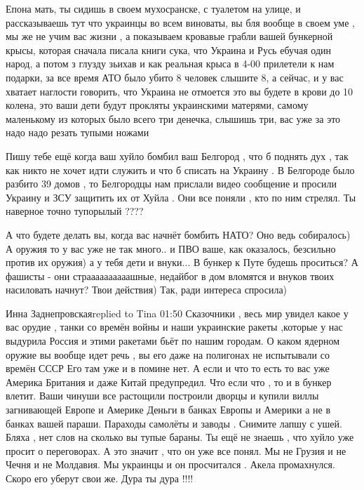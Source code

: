 {Епона мать, ты сидишь в своем мухосранске, с туалетом на улице, и рассказываешь
тут что украинцы во всем виноваты, вы бля вообще в своем уме , мы же не учим
вас жизни , а показываем кровавые грабли вашей бункерной крысы, которая сначала
писала книги сука, что Украина и Русь ебучая один народ, а потом з глузду
зьихав и как реальная крыса в 4-00 прилетели к нам подарки, за все время АТО
было убито 8 человек слышите 8, а сейчас, и у вас хватает наглости говорить,
что Украина не отмоется это вы будете в крови до 10 колена, это ваши дети будут
прокляты украинскими матерями, самому маленькому из которых было всего три
денечка, слышишь три, вас уже за это надо надо резать тупыми ножами


Пишу тебе ещё когда ваш хуйло бомбил ваш Белгород , что б поднять дух , так как
никто не хочет идти служить и что б списать на Украину . В Белгороде было
разбито 39 домов , то Белгородцы нам прислали видео сообщение и просили Украину
и ЗСУ защитить их от Хуйла . Они все поняли , кто по ним стрелял. Ты наверное
точно тупорылый ????


А что будете делать вы, когда вас начнёт бомбить НАТО? Оно ведь собиралось) А
оружия то у вас уже не так много.. и ПВО ваше, как оказалось, безсильно против
их оружия) а у тебя дети и внуки... В бункер к Путе будешь проситься? А фашисты
- они страааааааааашные, недайбог в дом вломятся и внуков твоих насиловать
начнут? Твои действия) Так, ради интереса спросила)

Инна Заднепровскаяreplied to Tina
01:50
Сказочники , весь мир увидел какое у вас орудие , танки со времён войны и наши украинские ракеты ,которые у нас выдурила Россия и этими ракетами бьёт по нашим городам. О каком ядерном оружие вы вообще идет речь , вы его даже на полигонах не испытывали со времён СССР Его там уже и в помине нет. А если и что то есть то вас уже Америка Британия и даже Китай предупредил. Что если что , то и в бункер влетит. Ваши чинуши все растощили построили дворцы и купили виллы загнивающей Европе и Америке Деньги в банках Европы и Америки а не в банках вашей параши. Параходы самолёты и заводы . Снимите лапшу с ушей. Бляха , нет слов на сколько вы тупые бараны. Ты ещё не знаешь , что хуйло уже просит о переговорах. А это значит , что он уже все понял. Мы не Грузия и не Чечня и не Молдавия. Мы украинцы и он просчитался . Акела промахнулся. Скоро его уберут свои же. Дура ты дура !!!!

}
